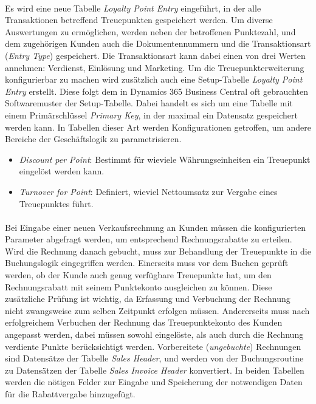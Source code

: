 \paragraph{}
Es wird eine neue Tabelle \textit{Loyalty Point Entry} eingeführt, in der alle Transaktionen betreffend Treuepunkten gespeichert werden. Um diverse Auswertungen zu ermöglichen, werden neben der betroffenen Punktezahl, und dem zugehörigen Kunden auch die Dokumentennummern und die Transaktionsart (\textit{Entry Type}) gespeichert. Die Transaktionsart kann dabei einen von drei Werten annehmen: Verdienst, Einlösung und Marketing. Um die Treuepunkterweiterung konfigurierbar zu machen wird zusätzlich auch eine Setup-Tabelle \textit{Loyalty Point Entry} erstellt. Diese folgt dem in Dynamics 365 Business Central oft gebrauchten Softwaremuster der Setup-Tabelle. Dabei handelt es sich um eine Tabelle mit einem Primärschlüssel \textit{Primary Key}, in der maximal ein Datensatz gespeichert werden kann. In Tabellen dieser Art werden Konfigurationen getroffen, um andere Bereiche der Geschäftslogik zu parametrisieren.

\begin{itemize}
	\item \textit{Discount per Point}: Bestimmt für wieviele Währungseinheiten ein Treuepunkt eingelöst werden kann.
	\item \textit{Turnover for Point}: Definiert, wieviel Nettoumsatz zur Vergabe eines Treuepunktes führt.
\end{itemize}

\paragraph{}
Bei Eingabe einer neuen Verkaufsrechnung an Kunden müssen die konfigurierten Parameter abgefragt werden, um entsprechend Rechnungsrabatte zu erteilen. Wird die Rechnung danach gebucht, muss zur Behandlung der Treuepunkte in die Buchungslogik eingegriffen werden. Einerseits muss vor dem Buchen geprüft werden, ob der Kunde auch genug verfügbare Treuepunkte hat, um den Rechnungsrabatt mit seinem Punktekonto ausgleichen zu können. Diese zusätzliche Prüfung ist wichtig, da Erfassung und Verbuchung der Rechnung nicht zwangsweise zum selben Zeitpunkt erfolgen müssen. Andererseits muss nach erfolgreichem Verbuchen der Rechnung das Treuepunktekonto des Kunden angepasst werden, dabei müssen sowohl eingelöste, als auch durch die Rechnung verdiente Punkte berücksichtigt werden. Vorbereitete (\textit{ungebuchte}) Rechnungen sind Datensätze der Tabelle \textit{Sales Header}, und werden von der Buchungsroutine zu Datensätzen der Tabelle \textit{Sales Invoice Header} konvertiert. In beiden Tabellen werden die nötigen Felder zur Eingabe und Speicherung der notwendigen Daten für die Rabattvergabe hinzugefügt.

